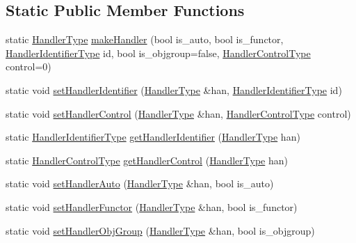 \subsection*{Static Public Member Functions}
\begin{DoxyCompactItemize}
\item 
static \hyperlink{namespacevt_af64846b57dfcaf104da3ef6967917573}{Handler\+Type} \hyperlink{structvt_1_1_handler_manager_afdcf47dc33bf1b88081e6cf19d033e7b}{make\+Handler} (bool is\+\_\+auto, bool is\+\_\+functor, \hyperlink{namespacevt_a59ae068fe828d1c33051ff96f3d016b6}{Handler\+Identifier\+Type} id, bool is\+\_\+objgroup=false, \hyperlink{namespacevt_adbbef13b92f0a93b14c219b7cc8a48f2}{Handler\+Control\+Type} control=0)
\item 
static void \hyperlink{structvt_1_1_handler_manager_a5501e67dbd88836fecdf434548de0909}{set\+Handler\+Identifier} (\hyperlink{namespacevt_af64846b57dfcaf104da3ef6967917573}{Handler\+Type} \&han, \hyperlink{namespacevt_a59ae068fe828d1c33051ff96f3d016b6}{Handler\+Identifier\+Type} id)
\item 
static void \hyperlink{structvt_1_1_handler_manager_a8cfa04599d2bd111f1197b7bf2343a05}{set\+Handler\+Control} (\hyperlink{namespacevt_af64846b57dfcaf104da3ef6967917573}{Handler\+Type} \&han, \hyperlink{namespacevt_adbbef13b92f0a93b14c219b7cc8a48f2}{Handler\+Control\+Type} control)
\item 
static \hyperlink{namespacevt_a59ae068fe828d1c33051ff96f3d016b6}{Handler\+Identifier\+Type} \hyperlink{structvt_1_1_handler_manager_a1fc8635a26795f11f16f47eaf74b25a7}{get\+Handler\+Identifier} (\hyperlink{namespacevt_af64846b57dfcaf104da3ef6967917573}{Handler\+Type} han)
\item 
static \hyperlink{namespacevt_adbbef13b92f0a93b14c219b7cc8a48f2}{Handler\+Control\+Type} \hyperlink{structvt_1_1_handler_manager_a90bf2b080d44af243e5a35bf8836d161}{get\+Handler\+Control} (\hyperlink{namespacevt_af64846b57dfcaf104da3ef6967917573}{Handler\+Type} han)
\item 
static void \hyperlink{structvt_1_1_handler_manager_a9100f9e0e946b58d98d104a5cbcf5574}{set\+Handler\+Auto} (\hyperlink{namespacevt_af64846b57dfcaf104da3ef6967917573}{Handler\+Type} \&han, bool is\+\_\+auto)
\item 
static void \hyperlink{structvt_1_1_handler_manager_a25c8a39b9faea3e894021d5c6d52f903}{set\+Handler\+Functor} (\hyperlink{namespacevt_af64846b57dfcaf104da3ef6967917573}{Handler\+Type} \&han, bool is\+\_\+functor)
\item 
static void \hyperlink{structvt_1_1_handler_manager_a0822ddaf90168e28fc9974e7f672b529}{set\+Handler\+Obj\+Group} (\hyperlink{namespacevt_af64846b57dfcaf104da3ef6967917573}{Handler\+Type} \&han, bool is\+\_\+objgroup)

\end{DoxyCompactItemize}
